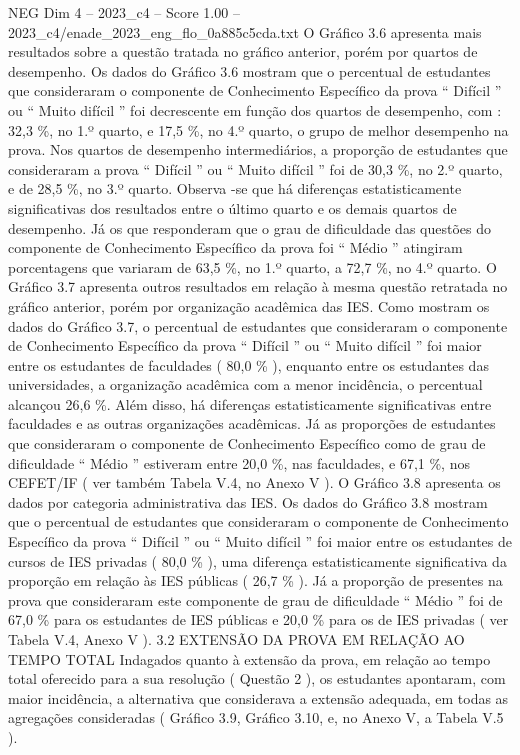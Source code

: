 \begin{textsample}{NEG Dim 4 – 2023\_c4 – Score 1.00 – 2023\_c4/enade\_2023\_eng\_flo\_0a885c5cda.txt}
O Gráfico 3.6 apresenta mais resultados sobre a questão tratada no gráfico anterior, porém por quartos de desempenho.
Os dados do Gráfico 3.6 mostram que o percentual de estudantes que consideraram o componente de Conhecimento Específico da prova “ Difícil ” ou “ Muito difícil ” foi decrescente em função dos quartos de desempenho, com : 32,3 \%, no 1.º quarto, e 17,5 \%, no 4.º quarto, o grupo de melhor desempenho na prova.
Nos quartos de desempenho intermediários, a proporção de estudantes que consideraram a prova “ Difícil ” ou “ Muito difícil ” foi de 30,3 \%, no 2.º quarto, e de 28,5 \%, no 3.º quarto.
Observa -se que há diferenças estatisticamente significativas dos resultados entre o último quarto e os demais quartos de desempenho.
Já os que responderam que o grau de dificuldade das questões do componente de Conhecimento Específico da prova foi “ Médio ” atingiram porcentagens que variaram de 63,5 \%, no 1.º quarto, a 72,7 \%, no 4.º quarto.
O Gráfico 3.7 apresenta outros resultados em relação à mesma questão retratada no gráfico anterior, porém por organização acadêmica das IES.
Como mostram os dados do Gráfico 3.7, o percentual de estudantes que consideraram o componente de Conhecimento Específico da prova “ Difícil ” ou “ Muito difícil ” foi maior entre os estudantes de faculdades ( 80,0 \% ), enquanto entre os estudantes das universidades, a organização acadêmica com a menor incidência, o percentual alcançou 26,6 \%.
Além disso, há diferenças estatisticamente significativas entre faculdades e as outras organizações acadêmicas.
Já as proporções de estudantes que consideraram o componente de Conhecimento Específico como de grau de dificuldade “ Médio ” estiveram entre 20,0 \%, nas faculdades, e 67,1 \%, nos CEFET/IF ( ver também Tabela V.4, no Anexo V ).
O Gráfico 3.8 apresenta os dados por categoria administrativa das IES.
Os dados do Gráfico 3.8 mostram que o percentual de estudantes que consideraram o componente de Conhecimento Específico da prova “ Difícil ” ou “ Muito difícil ” foi maior entre os estudantes de cursos de IES privadas ( 80,0 \% ), uma diferença estatisticamente significativa da proporção em relação às IES públicas ( 26,7 \% ).
Já a proporção de presentes na prova que consideraram este componente de grau de dificuldade “ Médio ” foi de 67,0 \% para os estudantes de IES públicas e 20,0 \% para os de IES privadas ( ver Tabela V.4, Anexo V ). 3.2 EXTENSÃO DA PROVA EM RELAÇÃO AO TEMPO TOTAL Indagados quanto à extensão da prova, em relação ao tempo total oferecido para a sua resolução ( Questão 2 ), os estudantes apontaram, com maior incidência, a alternativa que considerava a extensão adequada, em todas as agregações consideradas ( Gráfico 3.9, Gráfico 3.10, e, no Anexo V, a Tabela V.5 ).

\end{textsample}
